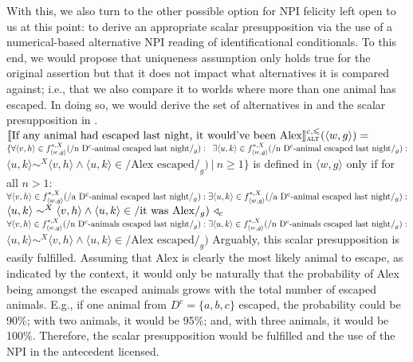 With this, we also turn to the other possible option for NPI felicity left open to us at this point: to derive an appropriate scalar presupposition via the use of a numerical-based alternative NPI reading of identificational conditionals. To this end, we would propose that  uniqueness assumption only holds true for the original assertion but that it does not impact what alternatives it is compared against; i.e., that we also compare it to worlds where more than one animal has escaped. In doing so, we would derive the set of alternatives in  and the scalar presupposition in .
\ex{}
$\intension[c,\leqslant]{If any animal had escaped last night, it would've been Alex}_\text{\scshape alt}(\langle w,g\rangle)=$\\$\{\forall{\langle v,h\rangle\in f^{*,X}_{\langle w,g\rangle}(/\text{n D\textsuperscript{c}-animal escaped last night}/_g)}:\\\phantom{\{}\exists\langle u,k\rangle\in f^{*,X}_{\langle w,g\rangle}(/\text{n D\textsuperscript{c}-animal escaped last night}/_g):$\\\emptyfill$\langle u,k\rangle\sim^X\langle v,h\rangle\land\langle u,k\rangle\in/\text{Alex escaped}/_g)~|~n\geqslant1\}$
\xe
\ex{}
{}\linebreak
is defined in $\langle w,g\rangle$ only if for all $n>1$:\\
$\forall{\langle v,h\rangle\in f^{*,X}_{\langle w,g\rangle}(/\text{a D\textsuperscript{c}-animal escaped last night}/_g)}:\\\exists\langle u,k\rangle\in f^{*,X}_{\langle w,g\rangle}(/\text{a D\textsuperscript{c}-animal escaped last night}/_g):$\\\emptyfill$\langle u,k\rangle\sim^X\langle v,h\rangle\land\langle u,k\rangle\in/\text{it was Alex}/_g)~\lprob_c$\\
$\forall{\langle v,h\rangle\in f^{*,X}_{\langle w,g\rangle}(/\text{n D\textsuperscript{c}-animals escaped last night}/_g)}:\\\exists\langle u,k\rangle\in f^{*,X}_{\langle w,g\rangle}(/\text{n D\textsuperscript{c}-animals escaped last night}/_g):$\\\emptyfill$\langle u,k\rangle\sim^X\langle v,h\rangle\land\langle u,k\rangle\in/\text{Alex escaped}/_g)$
\xe
Arguably, this scalar presupposition is easily fulfilled. Assuming that Alex is clearly the most likely animal to escape, as indicated by the context, it would only be naturally that the probability of Alex being amongst the escaped animals grows with the total number of escaped animals. E.g., if one animal from $D^c=\{a,b,c\}$ escaped, the probability could be 90\%; with two animals, it would be 95\%; and, with three animals, it would be 100\%. Therefore, the scalar presupposition would be fulfilled and the use of the NPI in the antecedent licensed.

